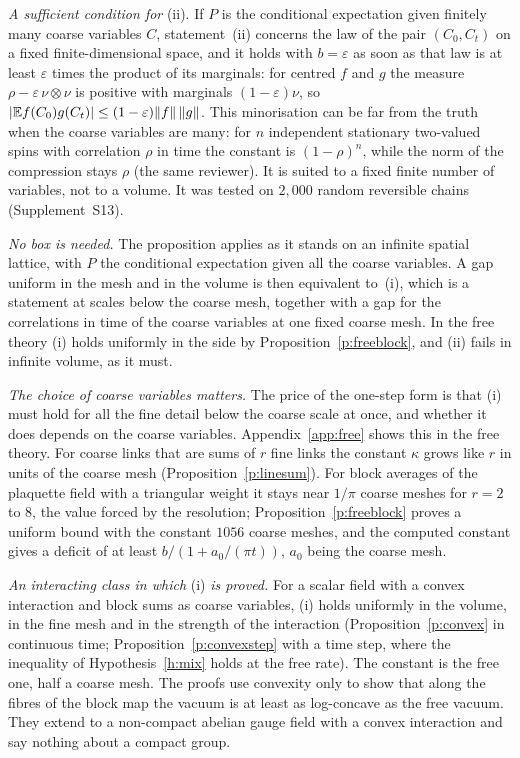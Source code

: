 \emph{A sufficient condition for} (ii). If $P$ is the conditional expectation given finitely many coarse
variables $C$, statement~(ii) concerns the law of the pair $(C_0,C_t)$ on a fixed finite-dimensional space,
and it holds with $b=\varepsilon$ as soon as that law is at least $\varepsilon$ times the product of its
marginals: for centred $f$ and $g$ the measure $\rho-\varepsilon\,\nu\otimes\nu$ is positive with marginals
$(1-\varepsilon)\nu$, so $|\mathbb{E} f(C_0)g(C_t)|\le(1-\varepsilon)\|f\|\,\|g\|$. This minorisation can be far
from the truth when the coarse variables are many: for $n$ independent stationary two-valued spins with
correlation $\rho$ in time the constant is $(1-\rho)^n$, while the norm of the compression stays $\rho$
(the same reviewer). It is suited to a fixed finite number of variables, not to a volume. It was tested on
$2{,}000$ random reversible chains (Supplement~S13).

\emph{No box is needed.} The proposition applies as it stands on an infinite spatial lattice, with $P$ the
conditional expectation given all the coarse variables. A gap uniform in the mesh and in the volume is then
equivalent to~(i), which is a statement at scales below the coarse mesh, together with a gap for the
correlations in time of the coarse variables at one fixed coarse mesh. In the free theory (i) holds
uniformly in the side by Proposition~\ref{p:freeblock}, and (ii) fails in infinite volume, as it must.

\emph{The choice of coarse variables matters.} The price of the one-step form is that (i) must hold for all
the fine detail below the coarse scale at once, and whether it does depends on the coarse variables.
Appendix~\ref{app:free} shows this in the free theory. For coarse links that are sums of $r$ fine links the
constant $\kappa$ grows like $r$ in units of the coarse mesh (Proposition~\ref{p:linesum}). For block
averages of the plaquette field with a triangular weight it stays near $1/\pi$ coarse meshes for $r=2$ to
$8$, the value forced by the resolution; Proposition~\ref{p:freeblock} proves a uniform bound with the
constant $1056$ coarse meshes, and the computed constant gives a deficit of at least $b/(1+a_0/(\pi t))$,
$a_0$ being the coarse mesh.

\emph{An interacting class in which} (i) \emph{is proved.} For a scalar field with a convex interaction and
block sums as coarse variables, (i) holds uniformly in the volume, in the fine mesh and in the strength of
the interaction (Proposition~\ref{p:convex} in continuous time; Proposition~\ref{p:convexstep} with a time
step, where the inequality of Hypothesis~\ref{h:mix} holds at the free rate). The constant is the free one,
half a coarse mesh. The proofs use convexity only to show that along the fibres of the block map the vacuum
is at least as log-concave as the free vacuum. They extend to a non-compact abelian gauge field with a
convex interaction and say nothing about a compact group.

